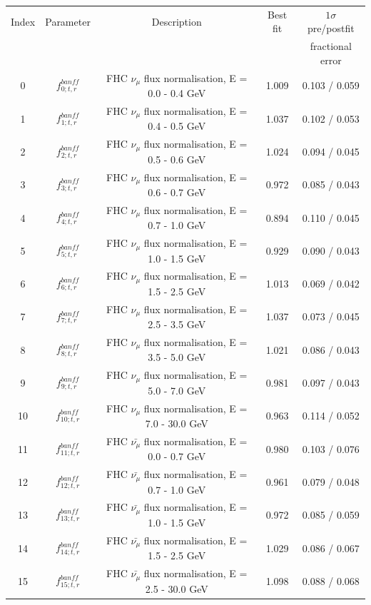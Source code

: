 \begin{tabular} { | c | c | c | c | c |  }
\hline 
Index & Parameter & Description & Best fit & $1\sigma$ pre/postfit\\ 
 & &  &  & fractional error\\
\hline 
0 & $f_{0; t, r}^{banff}$ & FHC $\nu_\mu$ flux normalisation, E = 0.0 - 0.4 GeV & 1.009 & 0.103 / 0.059\\ 
1 & $f_{1; t, r}^{banff}$ & FHC $\nu_\mu$ flux normalisation, E = 0.4 - 0.5 GeV & 1.037 & 0.102 / 0.053\\ 
2 & $f_{2; t, r}^{banff}$ & FHC $\nu_\mu$ flux normalisation, E = 0.5 - 0.6 GeV & 1.024 & 0.094 / 0.045\\ 
3 & $f_{3; t, r}^{banff}$ & FHC $\nu_\mu$ flux normalisation, E = 0.6 - 0.7 GeV & 0.972 & 0.085 / 0.043\\ 
4 & $f_{4; t, r}^{banff}$ & FHC $\nu_\mu$ flux normalisation, E = 0.7 - 1.0 GeV & 0.894 & 0.110 / 0.045\\ 
5 & $f_{5; t, r}^{banff}$ & FHC $\nu_\mu$ flux normalisation, E = 1.0 - 1.5 GeV & 0.929 & 0.090 / 0.043\\ 
6 & $f_{6; t, r}^{banff}$ & FHC $\nu_\mu$ flux normalisation, E = 1.5 - 2.5 GeV & 1.013 & 0.069 / 0.042\\ 
7 & $f_{7; t, r}^{banff}$ & FHC $\nu_\mu$ flux normalisation, E = 2.5 - 3.5 GeV & 1.037 & 0.073 / 0.045\\ 
8 & $f_{8; t, r}^{banff}$ & FHC $\nu_\mu$ flux normalisation, E = 3.5 - 5.0 GeV & 1.021 & 0.086 / 0.043\\ 
9 & $f_{9; t, r}^{banff}$ & FHC $\nu_\mu$ flux normalisation, E = 5.0 - 7.0 GeV & 0.981 & 0.097 / 0.043\\ 
10 & $f_{10; t, r}^{banff}$ & FHC $\nu_\mu$ flux normalisation, E = 7.0 - 30.0 GeV & 0.963 & 0.114 / 0.052\\ 
11 & $f_{11; t, r}^{banff}$ & FHC $\bar{\nu_\mu}$ flux normalisation, E = 0.0 - 0.7 GeV & 0.980 & 0.103 / 0.076\\ 
12 & $f_{12; t, r}^{banff}$ & FHC $\bar{\nu_\mu}$ flux normalisation, E = 0.7 - 1.0 GeV & 0.961 & 0.079 / 0.048\\ 
13 & $f_{13; t, r}^{banff}$ & FHC $\bar{\nu_\mu}$ flux normalisation, E = 1.0 - 1.5 GeV & 0.972 & 0.085 / 0.059\\ 
14 & $f_{14; t, r}^{banff}$ & FHC $\bar{\nu_\mu}$ flux normalisation, E = 1.5 - 2.5 GeV & 1.029 & 0.086 / 0.067\\ 
15 & $f_{15; t, r}^{banff}$ & FHC $\bar{\nu_\mu}$ flux normalisation, E = 2.5 - 30.0 GeV & 1.098 & 0.088 / 0.068\\ 

\end{tabular}
